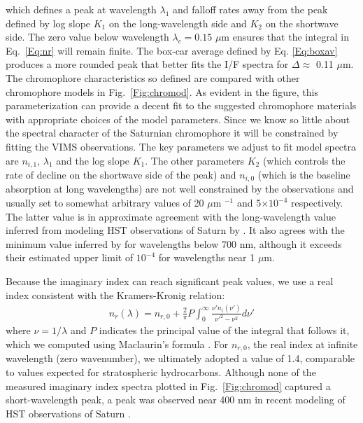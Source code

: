\documentclass[article,11pt]{emulateapj}
\def\mum{$\mu$m }
\def\mumx{$\mu$m}
\begin{document}
\noindent which defines a peak at wavelength $\lambda_1$ and falloff
rates away from the peak defined by log slope $K_1$ on the
long-wavelength side and $K_2$ on the shortwave side. The zero value
below wavelength $\lambda_c = 0.15$ \mum ensures that the integral in
Eq.\ \ref{Eq:nr} will remain finite.  The box-car average defined by
Eq. \ref{Eq:boxav} produces a more rounded peak that better fits the
I/F spectra for $\Delta \approx$ 0.11 \mumx.  The chromophore
characteristics so defined are compared with other chromophore models
in Fig.\ \ref{Fig:chromod}.  As evident in the figure, this
parameterization can provide a decent fit to the suggested chromophore
materials with appropriate choices of the model parameters. Since we
know so little about the spectral character of the Saturnian
chromophore it will be constrained by fitting the VIMS
observations. The key parameters we adjust to fit model spectra are
$n_{i,1}$, $\lambda_1$ and the log slope $K_1$. The other parameters
$K_2$ (which controls the rate of decline on the shortwave side of the
peak) and $n_{i,0}$ (which is the baseline absorption at long
wavelengths) are not well constrained by the observations and usually
set to somewhat arbitrary values of 20 \mum$^{-1}$ and 5$\times
10^{-4}$ respectively. The latter value is in approximate agreement
with the long-wavelength value inferred from modeling HST observations
of Saturn by \cite{Sanchez-Lavega2020hazes}. It also agrees with the
minimum value inferred by \cite{Kark2005} for wavelengths below 700
nm, although it exceeds their estimated upper limit of $10^{-4}$ for
wavelengths near 1 \mumx.

Because
the imaginary index can reach significant peak values, we use a real
index consistent with the Kramers-Kronig relation:
\begin{eqnarray}
n_r(\lambda) =  n_{r,0} + \frac{2}{\pi} P \int_0^\infty\frac{\nu' n_i(\nu')}{\nu'^2-\nu^2}d\nu'
\label{Eq:nr}
\end{eqnarray}
\noindent where $\nu = 1/\lambda$ and $P$ indicates the principal value of the 
integral that follows it, which we computed using Maclaurin's formula \citep{Ohta1988}.
 For $n_{r,0}$, the real index at infinite
wavelength (zero wavenumber), we ultimately adopted a value of 1.4, comparable to
values expected for stratospheric hydrocarbons.  Although none of the measured
imaginary index spectra plotted in Fig.\ \ref{Fig:chromod} captured a short-wavelength
peak, a peak was observed near 400 nm in recent modeling of HST observations of 
Saturn \citep{Sanchez-Lavega2020hazes}.
\end{document}

